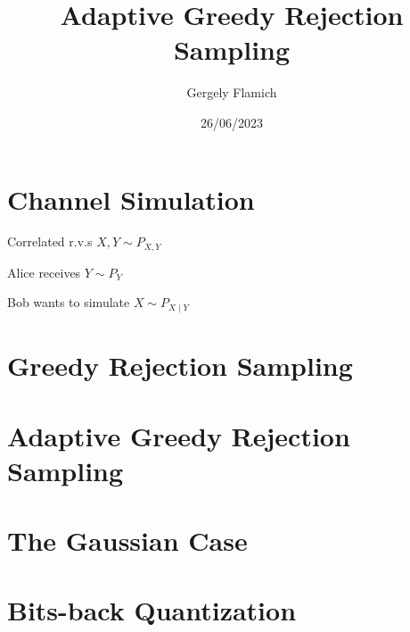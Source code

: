 \documentclass[11pt]{article}
\author{Gergely Flamich}
\date{26/06/2023}
\title{Adaptive Greedy Rejection Sampling}
\begin{document}
\maketitle

\section{Channel Simulation}
\label{sec:org52c6a9b}
Correlated r.v.s \(X, Y \sim P_{X, Y}\)

Alice receives \(Y \sim P_Y\)

Bob wants to simulate \(X \sim P_{X \mid Y}\)
\section{Greedy Rejection Sampling}
\label{sec:org796221f}

\section{Adaptive Greedy Rejection Sampling}
\label{sec:orgb6b1e8d}

\section{The Gaussian Case}
\label{sec:org37fbd4a}

\section{Bits-back Quantization}
\label{sec:org528283f}
\end{document}
